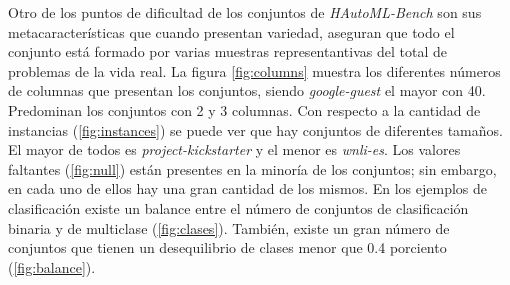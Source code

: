 Otro de los puntos de dificultad de los conjuntos de \textit{HAutoML-Bench} son sus metacaracterísticas que cuando presentan
variedad, aseguran que todo el conjunto está formado por varias muestras representantivas del total de problemas de la vida real.
La figura \ref{fig:columns} muestra los diferentes números de columnas que presentan los conjuntos, siendo \textit{google-guest} el mayor con 40. 
Predominan los conjuntos con 2 y 3 columnas. 
Con respecto a la cantidad de instancias (\ref{fig:instances}) se puede ver que hay conjuntos de diferentes tamaños.
El mayor de todos es \textit{project-kickstarter} y el menor es \textit{wnli-es}.
Los valores faltantes (\ref{fig:null}) están presentes en la minoría de los conjuntos; sin embargo, en cada uno de ellos hay una 
gran cantidad de los mismos. 
En los ejemplos de clasificación existe un balance entre el número de conjuntos de clasificación binaria y de multiclase (\ref{fig:clases}). 
También,  existe un gran número de conjuntos que tienen un desequilibrio de clases menor que 0.4 porciento (\ref{fig:balance}).


